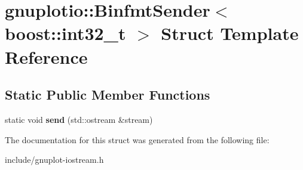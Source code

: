 \hypertarget{structgnuplotio_1_1BinfmtSender_3_01boost_1_1int32__t_01_4}{}\section{gnuplotio\+:\+:Binfmt\+Sender$<$ boost\+:\+:int32\+\_\+t $>$ Struct Template Reference}
\label{structgnuplotio_1_1BinfmtSender_3_01boost_1_1int32__t_01_4}
\subsection*{Static Public Member Functions}
\begin{DoxyCompactItemize}
\item 
\mbox{\label{structgnuplotio_1_1BinfmtSender_3_01boost_1_1int32__t_01_4_a44f75b80ef3f5def62eaa2093810fd35}} 
static void {\bfseries send} (std\+::ostream \&stream)
\end{DoxyCompactItemize}


The documentation for this struct was generated from the following file\+:\begin{DoxyCompactItemize}
\item 
include/gnuplot-\/iostream.\+h\end{DoxyCompactItemize}

